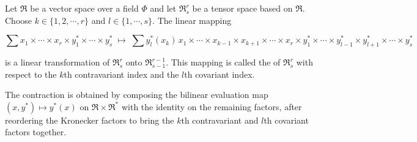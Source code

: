 Let $\Re$ be a vector space over a field $\Phi$ and let $\Re_s^r$ be a tensor space based on $\Re$. Choose $k \in \{1, 2, \cdots, r\}$ and $l \in \{1, \cdots, s\}$. The linear mapping

$$\sum x_1 \times \cdots \times x_r \times y_1^* \times \cdots \times y_s^* \;\longmapsto\; \sum y_l^*(x_k) \, x_1 \times \cdots \times x_{k-1} \times x_{k+1} \times \cdots \times x_r \times y_1^* \times \cdots \times y_{l-1}^* \times y_{l+1}^* \times \cdots \times y_s^*$$

is a linear transformation of $\Re_s^r$ onto $\Re_{s-1}^{r-1}$. This mapping is called the  of $\Re_s^r$ with respect to the $k$th contravariant index and the $l$th covariant index.

The contraction is obtained by composing the bilinear evaluation map $(x, y^*) \mapsto y^*(x)$ on $\Re \times \Re^*$ with the identity on the remaining factors, after reordering the Kronecker factors to bring the $k$th contravariant and $l$th covariant factors together.
